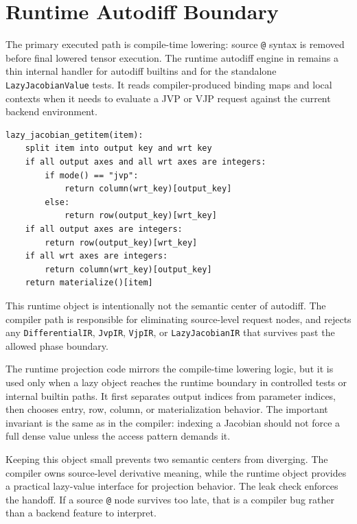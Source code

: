 \section{Runtime Autodiff Boundary}

The primary executed path is compile-time lowering: source \texttt{@} syntax is
removed before final lowered tensor execution. The runtime autodiff engine in
 remains a thin internal
handler for autodiff builtins and for the standalone \texttt{LazyJacobianValue}
tests. It reads compiler-produced binding maps and local contexts when it needs
to evaluate a JVP or VJP request against the current backend environment.

\begin{lstlisting}[style=pythoncode,caption={Runtime lazy-value projection.}]
lazy_jacobian_getitem(item):
    split item into output key and wrt key
    if all output axes and all wrt axes are integers:
        if mode() == "jvp":
            return column(wrt_key)[output_key]
        else:
            return row(output_key)[wrt_key]
    if all output axes are integers:
        return row(output_key)[wrt_key]
    if all wrt axes are integers:
        return column(wrt_key)[output_key]
    return materialize()[item]
\end{lstlisting}

This runtime object is intentionally not the semantic center of autodiff. The
compiler path is responsible for eliminating source-level request nodes, and
 rejects any
\texttt{DifferentialIR}, \texttt{JvpIR}, \texttt{VjpIR}, or
\texttt{LazyJacobianIR} that survives past the allowed phase boundary.

The runtime projection code mirrors the compile-time lowering logic, but it is
used only when a lazy object reaches the runtime boundary in controlled tests or
internal builtin paths. It first separates output indices from parameter
indices, then chooses entry, row, column, or materialization behavior. The
important invariant is the same as in the compiler: indexing a Jacobian should
not force a full dense value unless the access pattern demands it.

Keeping this object small prevents two semantic centers from diverging. The
compiler owns source-level derivative meaning, while the runtime object
provides a practical lazy-value interface for projection behavior. The leak
check enforces the handoff. If a source \texttt{@} node survives too late, that
is a compiler bug rather than a backend feature to interpret.

